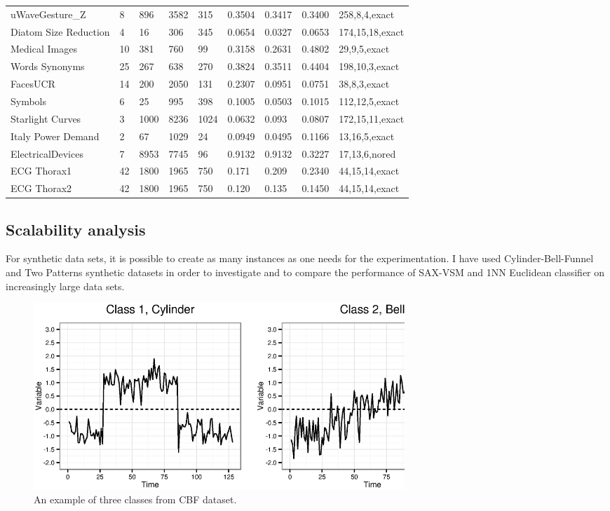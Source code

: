\begin{table}[t!]
{{\begin{tabularx}{\linewidth}{@{} l *7X @{} l}
uWaveGesture\_Z & 8 & 896 & 3582 & 315 & 0.3504 & 0.3417 & 0.3400 & 258,8,4,exact \\
Diatom Size Reduction & 4 & 16 & 306 & 345 & 0.0654 & 0.0327 & 0.0653 & 174,15,18,exact \\
Medical Images & 10 & 381 & 760 & 99 & 0.3158 & 0.2631 & 0.4802 & 29,9,5,exact \\
Words Synonyms & 25 & 267 & 638 & 270 & 0.3824 & 0.3511 & 0.4404 & 198,10,3,exact \\
FacesUCR & 14 & 200 & 2050 & 131 & 0.2307 & 0.0951 & 0.0751 & 38,8,3,exact \\
Symbols & 6 & 25 & 995 & 398 & 0.1005 & 0.0503 & 0.1015 & 112,12,5,exact \\
Starlight Curves & 3 & 1000 & 8236 & 1024 & 0.0632 & 0.093 & 0.0807 & 172,15,11,exact \\
Italy Power Demand & 2 & 67 & 1029 & 24 & 0.0949 & 0.0495 & 0.1166 & 13,16,5,exact \\
ElectricalDevices & 7 & 8953 & 7745 & 96 & 0.9132 & 0.9132 & 0.3227 & 17,13,6,nored \\
ECG Thorax1 & 42 & 1800 & 1965 & 750 & 0.171 & 0.209 & 0.2340 & 44,15,14,exact \\
ECG Thorax2 & 42 & 1800 & 1965 & 750 & 0.120 & 0.135 & 0.1450 & 44,15,14,exact \\
\hline
\end{tabularx}
}}
\end{table}

\newpage

\subsection{Scalability analysis} \label{scalability}
For synthetic data sets, it is possible to create as many instances as one needs for the experimentation.
I have used Cylinder-Bell-Funnel \cite{citeulike:12563781} and Two Patterns \cite{two_patterns} synthetic datasets 
in order to investigate and to compare the performance of SAX-VSM and 1NN Euclidean classifier on increasingly 
large data sets.

\begin{figure}[t]
   \centering
   \includegraphics[width=140mm]{figures/cbf.ps}
   \caption{An example of three classes from CBF dataset.}
   \label{fig:cbf}
\end{figure}

